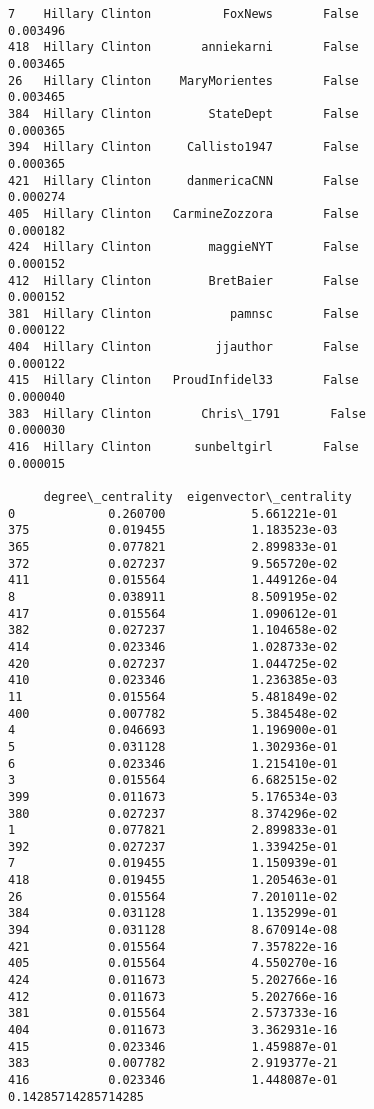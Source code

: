 \documentclass[11pt]{article}
\begin{document}
\begin{Verbatim}[commandchars=\\\{\}]
7    Hillary Clinton          FoxNews       False                0.003496   
418  Hillary Clinton       anniekarni       False                0.003465   
26   Hillary Clinton    MaryMorientes       False                0.003465   
384  Hillary Clinton        StateDept       False                0.000365   
394  Hillary Clinton     Callisto1947       False                0.000365   
421  Hillary Clinton     danmericaCNN       False                0.000274   
405  Hillary Clinton   CarmineZozzora       False                0.000182   
424  Hillary Clinton        maggieNYT       False                0.000152   
412  Hillary Clinton        BretBaier       False                0.000152   
381  Hillary Clinton           pamnsc       False                0.000122   
404  Hillary Clinton         jjauthor       False                0.000122   
415  Hillary Clinton   ProudInfidel33       False                0.000040   
383  Hillary Clinton       Chris\_1791       False                0.000030   
416  Hillary Clinton      sunbeltgirl       False                0.000015   

     degree\_centrality  eigenvector\_centrality  
0             0.260700            5.661221e-01  
375           0.019455            1.183523e-03  
365           0.077821            2.899833e-01  
372           0.027237            9.565720e-02  
411           0.015564            1.449126e-04  
8             0.038911            8.509195e-02  
417           0.015564            1.090612e-01  
382           0.027237            1.104658e-02  
414           0.023346            1.028733e-02  
420           0.027237            1.044725e-02  
410           0.023346            1.236385e-03  
11            0.015564            5.481849e-02  
400           0.007782            5.384548e-02  
4             0.046693            1.196900e-01  
5             0.031128            1.302936e-01  
6             0.023346            1.215410e-01  
3             0.015564            6.682515e-02  
399           0.011673            5.176534e-03  
380           0.027237            8.374296e-02  
1             0.077821            2.899833e-01  
392           0.027237            1.339425e-01  
7             0.019455            1.150939e-01  
418           0.019455            1.205463e-01  
26            0.015564            7.201011e-02  
384           0.031128            1.135299e-01  
394           0.031128            8.670914e-08  
421           0.015564            7.357822e-16  
405           0.015564            4.550270e-16  
424           0.011673            5.202766e-16  
412           0.011673            5.202766e-16  
381           0.015564            2.573733e-16  
404           0.011673            3.362931e-16  
415           0.023346            1.459887e-01  
383           0.007782            2.919377e-21  
416           0.023346            1.448087e-01  
0.14285714285714285

    \end{Verbatim}
\end{document}
